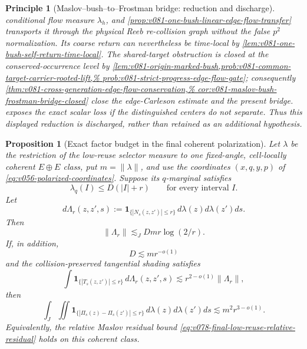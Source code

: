 \documentclass[10pt]{article}
\newtheorem{proposition}[theorem]{Proposition}
\newtheorem{principle}[theorem]{Principle}
\begin{document}
\begin{principle}[Maslov--bush--to--Frostman bridge: reduction and discharge]
conditional flow measure \(\lambda_h\), and
\cref{prop:v081-one-bush-linear-edge-flow-transfer} transports it through the physical Reeb
re-collision graph without the false \(p^2\) normalization.  Its coarse return can nevertheless be
time-local by \cref{lem:v081-one-bush-self-return-time-local}.  The shared-target obstruction is
closed at the conserved-occurrence level by
\cref{lem:v081-origin-marked-bush,prob:v081-common-target-carrier-rooted-lift,%
prob:v081-strict-progress-edge-flow-gate}; consequently
\cref{thm:v081-cross-generation-edge-flow-conservation,%
cor:v081-maslov-bush-frostman-bridge-closed} close the edge-Carleson estimate and the present
bridge.
 exposes the exact scalar loss if the
distinguished centers do not separate.  Thus this displayed reduction is discharged, rather than
retained as an additional hypothesis.
\end{principle}

\begin{proposition}[Exact factor budget in the final coherent polarization]
\label{prop:v078-final-coherent-factor-budget}
Let \(\lambda\) be the restriction of the low-reuse selector measure to one fixed-angle,
cell-locally coherent \(E\oplus E\) class, put \(m=\|\lambda\|\), and use the coordinates
\((x,q,y,p)\) of \eqref{eq:v056-polarized-coordinates}.  Suppose its \(q\)-marginal satisfies
\begin{equation}
\label{eq:v078-relative-normal-offset-frostman}
\lambda_q(I)
\le
D(|I|+r)
\qquad
\text{for every interval }I.
\end{equation}
Let
\[
d\Lambda_r(z,z',s)
:=
\mathbf 1_{\{|N_s(z,z')|\le r\}}
\,d\lambda(z)d\lambda(z')ds.
\]
Then
\begin{equation}
\label{eq:v078-final-normal-window-budget}
\boxed{
\|\Lambda_r\|
\lesssim_J
Dmr\log(2/r).
}
\end{equation}
If, in addition,
\begin{equation}
\label{eq:v078-final-relative-normal-density}
\boxed{D\lesssim mr^{-o(1)}}
\end{equation}
and the collision-preserved tangential shading satisfies
\begin{equation}
\label{eq:v078-final-conditional-tangential-factor}
\boxed{
\int
\mathbf 1_{\{|T_s(z,z')|\le r\}}\,d\Lambda_r(z,z',s)
\lesssim
r^{2-o(1)}\|\Lambda_r\|,
}
\end{equation}
then
\begin{equation}
\label{eq:v078-final-coherent-full-collision}
\boxed{
\int_J\iint
\mathbf 1_{\{|\Pi_s(z)-\Pi_s(z')|\le r\}}
\,d\lambda(z)d\lambda(z')ds
\lesssim
m^2r^{3-o(1)}.
}
\end{equation}
Equivalently, the relative Maslov residual bound
\eqref{eq:v078-final-low-reuse-relative-residual} holds on this coherent class.
\end{proposition}
\end{document}
